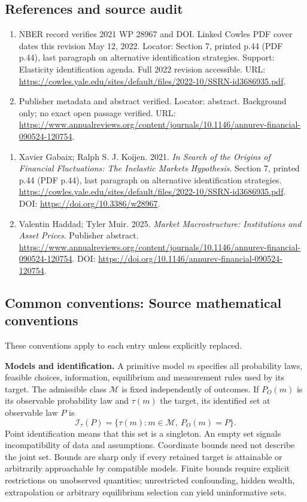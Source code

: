 \documentclass[11pt,a4paper]{article}
\begin{document}
\subsection*{References and source audit}
\begin{enumerate}
\item NBER record verifies 2021 WP 28967 and DOI. Linked Cowles PDF cover dates this revision May 12, 2022. Locator: Section 7, printed p.44 (PDF p.44), last paragraph on alternative identification strategies. Support: Elasticity identification agenda. Full 2022 revision accessible. URL: \url{https://cowles.yale.edu/sites/default/files/2022-10/SSRN-id3686935.pdf}.
\item Publisher metadata and abstract verified. Locator: abstract. Background only; no exact open passage verified. URL: \url{https://www.annualreviews.org/content/journals/10.1146/annurev-financial-090524-120754}.
\end{enumerate}
\begin{enumerate}\raggedright
\item\hypertarget{definitions:source:30007594:1}{} Xavier Gabaix; Ralph S. J. Koijen. 2021. \emph{In Search of the Origins of Financial Fluctuations: The Inelastic Markets Hypothesis}. Section 7, printed p.44 (PDF p.44), last paragraph on alternative identification strategies.
\url{https://cowles.yale.edu/sites/default/files/2022-10/SSRN-id3686935.pdf}.
DOI: \url{https://doi.org/10.3386/w28967}.
\item\hypertarget{definitions:source:30007594:2}{} Valentin Haddad; Tyler Muir. 2025. \emph{Market Macrostructure: Institutions and Asset Prices}. Publisher abstract.
\url{https://www.annualreviews.org/content/journals/10.1146/annurev-financial-090524-120754}.
DOI: \url{https://doi.org/10.1146/annurev-financial-090524-120754}.
\end{enumerate}

\subsection*{Common conventions: Source mathematical conventions}

These conventions apply to each entry unless explicitly replaced.

\textbf{Models and identification.} A primitive model \(m\) specifies all probability laws, feasible choices, information, equilibrium and measurement rules used by its target. The admissible class \(\mathcal M\) is fixed independently of outcomes. If \(P_O(m)\) is its observable probability law and \(\tau(m)\) the target, its identified set at observable law \(P\) is
\[
 \mathcal I_\tau(P)=\{\tau(m):m\in\mathcal M,\ P_O(m)=P\}.
\]
Point identification means that this set is a singleton. An empty set signals incompatibility of data and assumptions. Coordinate bounds need not describe the joint set. Bounds are sharp only if every retained target is attainable or arbitrarily approachable by compatible models. Finite bounds require explicit restrictions on unobserved quantities; unrestricted confounding, hidden wealth, extrapolation or arbitrary equilibrium selection can yield uninformative sets.
\end{document}
